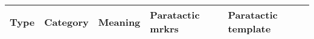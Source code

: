 \begin{longtable}{|l|l|l|l|l|}%
{\bf Type}  & {\bf Category}      & {\bf Meaning}                        & {\bf Paratactic mrkrs} & {\bf Paratactic template} \\ \hline


\end{longtable}
